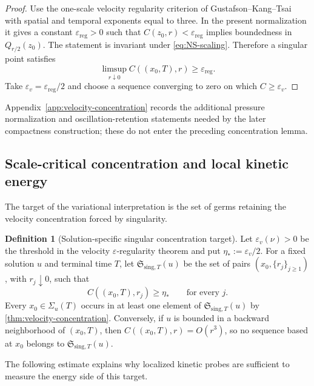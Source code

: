 \documentclass[11pt]{amsart}
\numberwithin{equation}{section}
\theoremstyle{plain}
\theoremstyle{definition}
\newtheorem{definition}[definition]{Definition}
\theoremstyle{remark}
\newcommand{\SingT}[1]{\mathfrak S_{\mathrm{sing},T}\!\left(#1\right)}
\begin{document}
\begin{proof}
Use the one-scale velocity regularity criterion of
Gustafson--Kang--Tsai \cite{GustafsonKangTsai2007} with spatial and temporal
exponents equal to three.  In the present normalization it gives a constant
\(\varepsilon_{\mathrm{reg}}>0\) such that
\(C(z_0,r)<\varepsilon_{\mathrm{reg}}\) implies boundedness in
\(Q_{r/2}(z_0)\).  The statement is invariant under
\eqref{eq:NS-scaling}.  Therefore a singular point satisfies
\[
 \limsup_{r\downarrow0}C((x_0,T),r)
 \ge\varepsilon_{\mathrm{reg}}.
\]
Take \(\varepsilon_v=\varepsilon_{\mathrm{reg}}/2\) and choose a sequence
converging to zero on which \(C\ge\varepsilon_v\).
\end{proof}

Appendix~\ref{app:velocity-concentration} records the additional pressure
normalization and oscillation-retention statements needed by the later
compactness construction; these do not enter the preceding concentration
lemma.

\subsection{Scale-critical concentration and local kinetic energy}

The target of the variational interpretation is the set of germs retaining
the velocity concentration forced by singularity.

\begin{definition}[Solution-specific singular concentration target]
\label{def:singular-target}
Let \(\varepsilon_v(\nu)>0\) be the threshold in the velocity
\(\varepsilon\)-regularity theorem and put \(\eta_*:=\varepsilon_v/2\).
For a fixed solution \(u\) and terminal time \(T\), let \(\SingT{u}\) be the
set of pairs
\((x_0,\{r_j\}_{j\ge1})\), with \(r_j\downarrow0\), such that
\begin{equation}\label{eq:singular-target}
 C((x_0,T),r_j)\ge\eta_*
 \qquad\text{for every }j.
\end{equation}
Every \(x_0\in\Sigma_u(T)\) occurs in at least one element of
\(\SingT{u}\) by \cref{thm:velocity-concentration}.  Conversely, if \(u\) is bounded in a
backward neighborhood of \((x_0,T)\), then
\(C((x_0,T),r)=O(r^3)\), so no sequence based at \(x_0\) belongs to
\(\SingT{u}\).
\end{definition}

The following estimate explains why localized kinetic probes are sufficient
to measure the energy side of this target.
\end{document}
